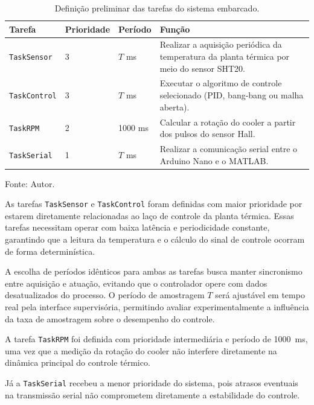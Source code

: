 \documentclass[repeatfields,xlists,xpacks,oneside]{ufrgscca}
\begin{document}
\begin{table}[htbp]
\centering
\caption{Definição preliminar das tarefas do sistema embarcado.}
\label{tab:tarefas_preliminares}
\begin{tabular}{p{3cm} p{2cm} p{2cm} p{7cm}}
\hline
\textbf{Tarefa} &
\textbf{Prioridade} &
\textbf{Período} &
\textbf{Função} \\
\hline

\texttt{TaskSensor} & 3 & $T$ ms &
Realizar a aquisição periódica da temperatura da planta
térmica por meio do sensor SHT20. \\

\texttt{TaskControl} & 3 & $T$ ms &
Executar o algoritmo de controle selecionado
(PID, bang-bang ou malha aberta). \\

\texttt{TaskRPM} & 2 & 1000 ms &
Calcular a rotação do cooler a partir dos pulsos do sensor
Hall. \\

\texttt{TaskSerial} & 1 & $T$ ms &
Realizar a comunicação serial entre o Arduino Nano e o
MATLAB\@. \\

\hline
\end{tabular}
\vspace{0.2cm}
\small Fonte: Autor.
\end{table}

As tarefas \texttt{TaskSensor} e
\texttt{TaskControl} foram definidas com maior prioridade
por estarem diretamente relacionadas ao laço de controle da
planta térmica. Essas tarefas necessitam operar com baixa
latência e periodicidade constante, garantindo que a leitura
da temperatura e o cálculo do sinal de controle ocorram de
forma determinística.

A escolha de períodos idênticos para ambas as tarefas busca
manter sincronismo entre aquisição e atuação, evitando que o
controlador opere com dados desatualizados do processo. O
período de amostragem $T$ será ajustável em tempo real pela
interface supervisória, permitindo avaliar experimentalmente
a influência da taxa de amostragem sobre o desempenho do
controle.

A tarefa \texttt{TaskRPM} foi definida com prioridade
intermediária e período de 1000~ms, uma vez que a medição da
rotação do cooler não interfere diretamente na dinâmica
principal do controle térmico.

Já a \texttt{TaskSerial} recebeu a menor prioridade do
sistema, pois atrasos eventuais na transmissão serial não
comprometem diretamente a estabilidade do controle.
\end{document}
